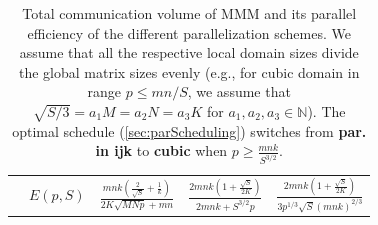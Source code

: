 \documentclass[sigplan,review,anonymous]{acmart}\settopmatter{printfolios=true,printccs=false,printacmref=false}
\begin{document}
\begin{table}[t]
\begin{tabular}{lllll}
		\cline{2-5}
		& $E(p,S)$ & $\frac{mnk(\frac{2}{\sqrt{S}} + 
			\frac{1}{k})}{2K\sqrt{MNp} 
			+ mn}$ & $\frac{2mnk(1 + 
			\frac{\sqrt{S}}{2K})}{2mnk + 
			S^{3/2}p}$ &   
		$\frac{2mnk(1 + 
			\frac{\sqrt{S}}{2K})}{3p^{1/3}\sqrt{S}(mnk)^{2/3}}$
			 \\
	\end{tabular}
	\caption{Total communication volume of MMM and its 
	parallel 
		efficiency of 
		the 
		different parallelization schemes. We assume that all 
		the 
		respective local 
		domain sizes divide the global matrix sizes evenly 
		(e.g., for 
		cubic domain 
		in range $p \le mn/S$, we assume that $\sqrt{S/3} = 
		a_1M = a_2N = 
		a_3K$ for 
		$a_1, a_2, a_3 \in \mathbb{N}$). The optimal schedule 
		(\cref{sec:parScheduling}) switches from \textbf{par. 
		in ijk} to 
		\textbf{cubic} when $p \ge \frac{mnk}{S^{3/2}}$.}
	\label{tab:mmmEfficiency}
\end{table}



\end{document}
